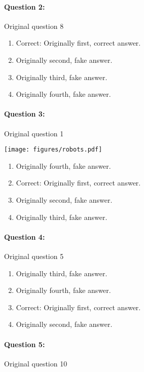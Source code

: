 \documentclass[9pt, twoside, twocolumn]{extarticle}
\renewcommand{\includegraphics}[2][]{\OldIncludegraphics[width=\linewidth, #1]{#2}}
\renewcommand{\caption}{}
\let\origfigure=\figure
\let\endorigfigure=\endfigure
\renewenvironment{figure}[1][]{%
  \origfigure[H]
}{%
  \endorigfigure
}
\begin{document}
\paragraph{Question 2:}
Original question 8

\begin{enumerate}[label=\textbf{{\Alph*}},labelindent=0pt, labelsep=1.5em, parsep=0.2em]
\item Correct: Originally first, correct answer.
\item Originally second, fake answer.
\item Originally third, fake answer.
\item Originally fourth, fake answer.
\end{enumerate}
\paragraph{Question 3:}
Original question 1

\begin{figure}\centering
\texttt{[image: figures/robots.pdf]}
\caption{\end{figure}
\begin{enumerate}[label=\textbf{{\Alph*}},labelindent=0pt, labelsep=1.5em, parsep=0.2em]
\item Originally fourth, fake answer.
\item Correct: Originally first, correct answer.
\item Originally second, fake answer.
\item Originally third, fake answer.
\end{enumerate}
\paragraph{Question 4:}
Original question 5

\begin{enumerate}[label=\textbf{{\Alph*}},labelindent=0pt, labelsep=1.5em, parsep=0.2em]
\item Originally third, fake answer.
\item Originally fourth, fake answer.
\item Correct: Originally first, correct answer.
\item Originally second, fake answer.
\end{enumerate}
\paragraph{Question 5:}
Original question 10
\end{document}
